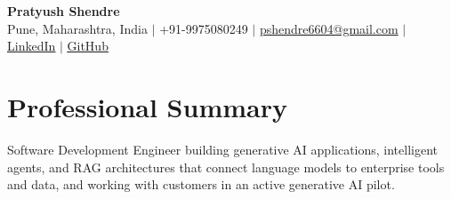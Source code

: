 \documentclass[a4paper,11pt]{article}
\begin{document}
\begin{center}
  {\Large\bfseries Pratyush Shendre}\\[2pt]
  \small Pune, Maharashtra, India $|$ +91-9975080249 $|$
  \href{mailto:pshendre6604@gmail.com}{pshendre6604@gmail.com} $|$
  \href{https://www.linkedin.com/in/pratyush-shendre-2256a7223/}{\underline{LinkedIn}} $|$
  \href{https://github.com/PratyushS04}{\underline{GitHub}}
\end{center}

\section{Professional Summary}
\small Software Development Engineer building generative AI applications, intelligent agents, and RAG architectures that connect language models to enterprise tools and data, and working with customers in an active generative AI pilot.
\end{document}
